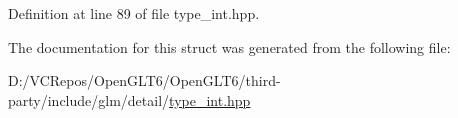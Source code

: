 Definition at line 89 of file type\+\_\+int.\+hpp.



The documentation for this struct was generated from the following file\+:\begin{DoxyCompactItemize}
\item 
D\+:/\+V\+C\+Repos/\+Open\+G\+L\+T6/\+Open\+G\+L\+T6/third-\/party/include/glm/detail/\mbox{\hyperlink{type__int_8hpp}{type\+\_\+int.\+hpp}}\end{DoxyCompactItemize}
